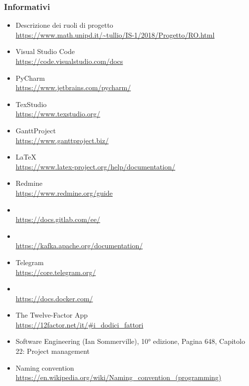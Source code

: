     \subsubsection{Informativi}	\label{rifinfo}
    \begin{itemize}
        \item Descrizione dei ruoli di progetto \\\url{https://www.math.unipd.it/~tullio/IS-1/2018/Progetto/RO.html}
        \item Visual Studio Code \\\url{https://code.visualstudio.com/docs}
        \item PyCharm \\\url{https://www.jetbrains.com/pycharm/}
        \item TexStudio \\\url{https://www.texstudio.org/}
        \item GanttProject \\\url{https://www.ganttproject.biz/}
		\item \LaTeX\ \\\url{https://www.latex-project.org/help/documentation/}
		\item Redmine \\\url{https://www.redmine.org/guide}
		\item {} \\\url{https://docs.gitlab.com/ee/}
		\item {} \\\url{https://kafka.apache.org/documentation/}
		\item Telegram \\\url{https://core.telegram.org/}
		\item {} \\\url{https://docs.docker.com/}
		\item The Twelve-Factor App \\\url{https://12factor.net/it/#i_dodici_fattori}
        \item Software Engineering (Ian Sommerville), 10° edizione,
        Pagina 648, Capitolo 22: Project management
        \item Naming convention \\\url{https://en.wikipedia.org/wiki/Naming_convention_(programming)}
	\end{itemize}
